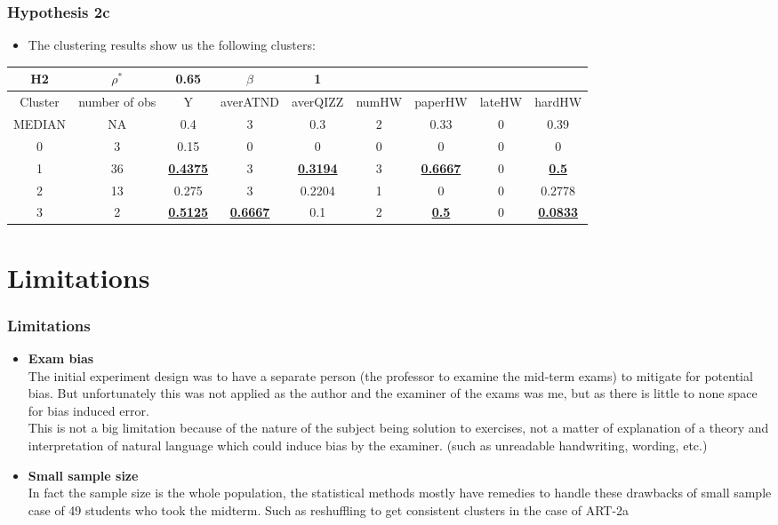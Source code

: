 \documentclass{beamer} %
\theoremstyle{definition}
\begin{document}
	\begin{frame}
		\frametitle{Hypothesis 2c}
		\centering
		\begin{itemize}
			\item The clustering results show us the following clusters:
		\end{itemize}
		\begin{table}
		\tiny
		\begin{tabular}{|c|c|c|c|c|c|c|c|c|}
		\hline
		H2 & $\rho^*$ & 0.65 & $\beta$ & 1 &  &  &  &  \\
		\hline
		Cluster & number of obs & Y & averATND & averQIZZ & numHW & paperHW & lateHW & hardHW \\
		\hline
		MEDIAN & NA & 0.4 & 3 & 0.3 & 2 & 0.33 & 0 & 0.39 \\
		\hline
		0 & 3 & 0.15 & 0 & 0 & 0 & 0 & 0 & 0 \\
		1 & 36 & \underline{\textbf{0.4375}} & 3 & \underline{\textbf{0.3194}} & 3 & \underline{\textbf{0.6667}} & 0 & \underline{\textbf{0.5}} \\
		2 & 13 & 0.275 & 3 & 0.2204 & 1 & 0 & 0 & 0.2778 \\
		3 & 2 & \underline{\textbf{0.5125}} & \underline{\textbf{0.6667}} & 0.1 & 2 & \underline{\textbf{0.5}} & 0 & \underline{\textbf{0.0833}} \\
		\hline
		\end{tabular}
		\end{table}
	\end{frame}
	
	
	\section{Limitations}
	
	\begin{frame}
		\frametitle{Limitations}
		
		  
		\centering
		\begin{itemize}
			\item \textbf{Exam bias}\\
			
			The initial experiment design was to have a separate person (the professor to examine the mid-term exams) to mitigate for potential bias.	But unfortunately this was not applied as the author and the examiner of the exams was me, but as there is little to none space for bias induced error.\\
			This is not a big limitation because of the nature of the subject being solution to exercises, not a matter of explanation of a theory and interpretation of natural language which could induce bias by the examiner. (such as unreadable handwriting, wording, etc.) 
			
			\item \textbf{Small sample size}\\
			
			In fact the sample size is the whole population, the statistical methods mostly have remedies to handle these drawbacks of small sample case of 49 students who took the midterm. Such as reshuffling to get consistent clusters in the case of ART-2a 
		\end{itemize}
	\end{frame}
	
\end{document}

